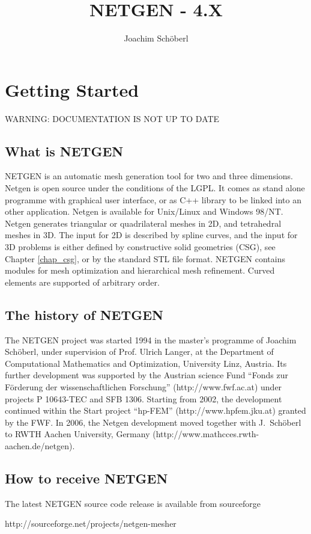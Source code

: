 \documentclass[12pt]{book}
\title{NETGEN - 4.X}
\author{Joachim Sch\"oberl}
\begin{document}
\maketitle
\tableofcontents

\chapter{Getting Started}


WARNING: DOCUMENTATION IS NOT UP TO DATE


\section{What is NETGEN}
NETGEN is an automatic mesh generation tool for two and three
dimensions. Netgen is open source under the conditions of the LGPL.
It comes as stand alone programme with graphical user
interface, or as C++ library to be linked into an other application.
Netgen is available for Unix/Linux and Windows 98/NT.  Netgen
generates triangular or quadrilateral meshes in 2D, and tetrahedral
meshes in 3D. The input for 2D is described by spline curves, and the
input for 3D problems is either defined by constructive solid
geometries (CSG), see Chapter \ref{chap_csg}, or by the standard STL
file format.  NETGEN contains modules for mesh optimization and
hierarchical mesh refinement. Curved elements are supported of arbitrary
order.


\section{The history of NETGEN}
%
The NETGEN project was started 1994 in the master's programme of
Joachim Sch\"oberl, under supervision of Prof. Ulrich Langer, at the
Department of Computational Mathematics and Optimization, University
Linz, Austria.  Its further development was supported by the Austrian
science Fund ``Fonds zur F\"orderung der wissenschaftlichen
Forschung'' (http://www.fwf.ac.at) under projects P 10643-TEC and SFB
1306.  Starting from 2002, the development continued within the Start
project ``hp-FEM'' (http://www.hpfem.jku.at) granted by the FWF.  In
2006, the Netgen development moved together with J.~Sch\"oberl to RWTH
Aachen University, Germany (http://www.mathcces.rwth-aachen.de/netgen).


\section{How to receive NETGEN}
%
The latest NETGEN source code release is available from sourceforge
\begin{center}
http://sourceforge.net/projects/netgen-mesher
\end{center}
\end{document}
